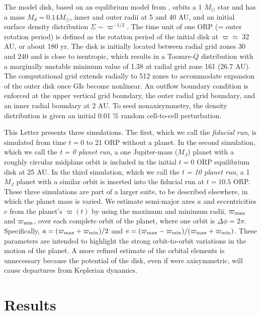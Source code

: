 \documentclass[12pt,manuscript,authoryear]{aastex}
\begin{document}
The model disk, based on an equlibrium model from \citet{pickett2003}, orbits a 1 $M_{\odot}$ star and has a mass $M_d = 0.14 M_{\odot}$, inner and outer radii at 5 and 40 AU, and an initial surface density distribution $\Sigma \sim \varpi^{-1/2}$. The time unit of one ORP (= outer rotation period) is defined as the rotation period of the initial disk at $\varpi \approx$ 32 AU, or about 180 yr. The disk is initially located between radial grid zones 30 and 240 and is close to isentropic, which results in a Toomre-$Q$ distribution with a marginally unstable \citep[see ][]{durisen2007} minimum value of 1.38 at radial grid zone 161 (26.7 AU). The computational grid extends radially to 512 zones to accommodate expansion of the outer disk once GIs become nonlinear. An outflow boundary condition is enforced at the upper vertical grid boundary, the outer radial grid boundary, and an inner radial boundary at 2 AU. To seed nonaxisymmetry, the density distribution is given an initial 0.01 \% random cell-to-cell perturbation.

This Letter presents three simulations. The first, which we call the {\sl fiducial run},  is simulated from time $t = 0$ to 21 ORP without a planet. In the second simulation, which we call the {\sl t = 0 planet run}, a one Jupiter-mass ($M_J$) planet with a roughly circular midplane orbit is included in the initial $t = 0$ ORP equilibrium disk at 25 AU. In the third simulation, which we call the {\sl t = 10 planet run}, a 1 $M_J$ planet with a similar orbit is inserted into the fiducial run at $t = 10.5$ ORP. These three simulations are part of a larger suite, to be described elsewhere, in which the planet mass is varied. We estimate semi-major axes $a$ and eccentricities $e$ from the planet's $\varpi(t)$ by using the maximum and minimum radii, $\varpi_{\rm max}$ and $\varpi_{\rm min}$, over each complete orbit of the planet, where one orbit is $\Delta\phi=2\pi$. Specifically, $a = (\varpi_{\rm max}+\varpi_{\rm min})/2$ and $e = (\varpi_{\rm max}-\varpi_{\rm min})/(\varpi_{\rm max}+\varpi_{\rm min})$. These parameters are intended to highlight the strong orbit-to-orbit variations in the motion of the planet.  A more refined estimate of the orbital elements is unnecessary because the potential of the disk, even if were axisymmetric, will cause departures from Keplerian dynamics.

\section{Results}
\end{document}

